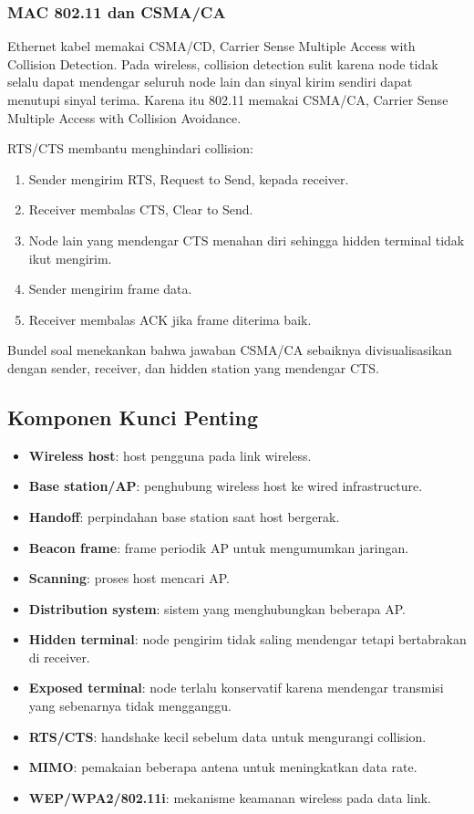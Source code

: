 \subsubsection*{MAC 802.11 dan CSMA/CA}

Ethernet kabel memakai CSMA/CD, Carrier Sense Multiple Access with Collision Detection. Pada wireless, collision detection sulit karena node tidak selalu dapat mendengar seluruh node lain dan sinyal kirim sendiri dapat menutupi sinyal terima. Karena itu 802.11 memakai CSMA/CA, Carrier Sense Multiple Access with Collision Avoidance.

RTS/CTS membantu menghindari collision:

\begin{enumerate}
    \item Sender mengirim RTS, Request to Send, kepada receiver.
    \item Receiver membalas CTS, Clear to Send.
    \item Node lain yang mendengar CTS menahan diri sehingga hidden terminal tidak ikut mengirim.
    \item Sender mengirim frame data.
    \item Receiver membalas ACK jika frame diterima baik.
\end{enumerate}

Bundel soal menekankan bahwa jawaban CSMA/CA sebaiknya divisualisasikan dengan sender, receiver, dan hidden station yang mendengar CTS.

\subsection{Komponen Kunci Penting}

\begin{itemize}
    \item \textbf{Wireless host}: host pengguna pada link wireless.
    \item \textbf{Base station/AP}: penghubung wireless host ke wired infrastructure.
    \item \textbf{Handoff}: perpindahan base station saat host bergerak.
    \item \textbf{Beacon frame}: frame periodik AP untuk mengumumkan jaringan.
    \item \textbf{Scanning}: proses host mencari AP.
    \item \textbf{Distribution system}: sistem yang menghubungkan beberapa AP.
    \item \textbf{Hidden terminal}: node pengirim tidak saling mendengar tetapi bertabrakan di receiver.
    \item \textbf{Exposed terminal}: node terlalu konservatif karena mendengar transmisi yang sebenarnya tidak mengganggu.
    \item \textbf{RTS/CTS}: handshake kecil sebelum data untuk mengurangi collision.
    \item \textbf{MIMO}: pemakaian beberapa antena untuk meningkatkan data rate.
    \item \textbf{WEP/WPA2/802.11i}: mekanisme keamanan wireless pada data link.
\end{itemize}

